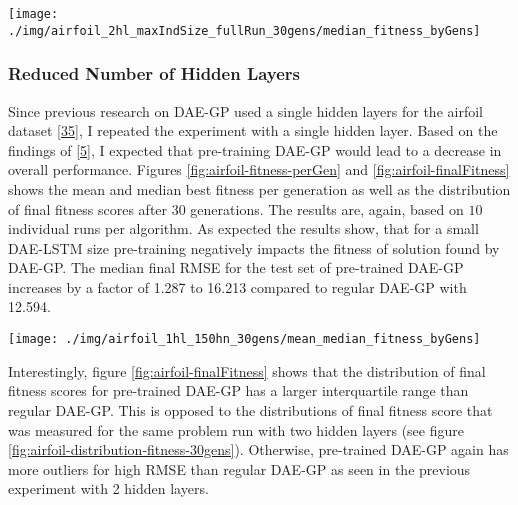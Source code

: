 \documentclass[
  11pt,
]{article}
\let\origfigure\figure
\let\endorigfigure\endfigure
\renewenvironment{figure}[1][2] {
    \expandafter\origfigure\expandafter[H]
} {
    \endorigfigure
}
\begin{document}
\begin{figure}[c]

{\centering \texttt{[image: ./img/airfoil\_2hl\_maxIndSize\_fullRun\_30gens/median\_fitness\_byGens]} 

}

\caption{Median Best Fitness over 30 Generations - Airfoil - Dynamic adjustment of regular DAE-GP}\label{fig:airfoil-maxIndSize-fitness}
\end{figure}

\hypertarget{reduced-number-of-hidden-layers}{%
\subsubsection{Reduced Number of Hidden Layers}\label{reduced-number-of-hidden-layers}}

Since previous research on DAE-GP used a single hidden layers for the airfoil dataset {[}\protect\hyperlink{ref-dae-gp_2022_symreg}{35}{]}, I repeated the experiment with a single hidden layer.
Based on the findings of {[}\protect\hyperlink{ref-pmlr-v5-erhan09a}{5}{]}, I expected that pre-training DAE-GP would lead to a decrease in overall performance.
Figures \ref{fig:airfoil-fitness-perGen} and \ref{fig:airfoil-finalFitness} shows the mean and median best fitness per generation as well as the distribution of final fitness scores after 30 generations.
The results are, again, based on \(10\) individual runs per algorithm.
As expected the results show, that for a small DAE-LSTM size pre-training negatively impacts the fitness of solution found by DAE-GP.
The median final RMSE for the test set of pre-trained DAE-GP increases by a factor of 1.287 to 16.213 compared to regular DAE-GP with 12.594.

\begin{figure}[c]

{\centering \texttt{[image: ./img/airfoil\_1hl\_150hn\_30gens/mean\_median\_fitness\_byGens]} 

}

\caption{Fitness over 30 Generations - Airfoil - Single Hidden Layer}\label{fig:airfoil-fitness-perGen}
\end{figure}

Interestingly, figure \ref{fig:airfoil-finalFitness} shows that the distribution of final fitness scores for pre-trained DAE-GP has a larger interquartile range than regular DAE-GP.
This is opposed to the distributions of final fitness score that was measured for the same problem run with two hidden layers (see figure \ref{fig:airfoil-distribution-fitness-30gens}).
Otherwise, pre-trained DAE-GP again has more outliers for high RMSE than regular DAE-GP as seen in the previous experiment with 2 hidden layers.
\end{document}
